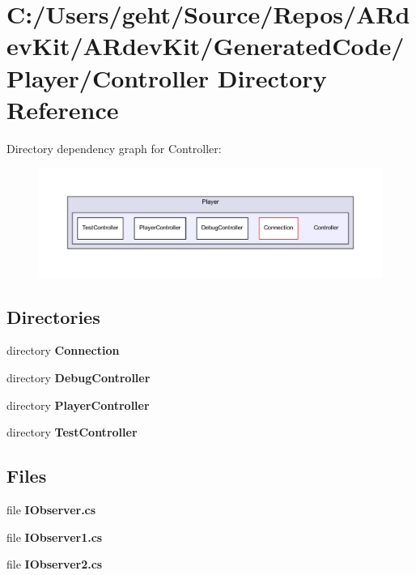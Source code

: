 \section{C\-:/\-Users/geht/\-Source/\-Repos/\-A\-Rdev\-Kit/\-A\-Rdev\-Kit/\-Generated\-Code/\-Player/\-Controller Directory Reference}
\label{dir_fa5375c86574866ac7e5551105b9b406}
Directory dependency graph for Controller\-:
\nopagebreak
\begin{figure}[H]
\begin{center}
\leavevmode
\includegraphics[width=350pt]{dir_fa5375c86574866ac7e5551105b9b406_dep}
\end{center}
\end{figure}
\subsection*{Directories}
\begin{DoxyCompactItemize}
\item 
directory {\bf Connection}
\item 
directory {\bf Debug\-Controller}
\item 
directory {\bf Player\-Controller}
\item 
directory {\bf Test\-Controller}
\end{DoxyCompactItemize}
\subsection*{Files}
\begin{DoxyCompactItemize}
\item 
file {\bfseries I\-Observer.\-cs}
\item 
file {\bfseries I\-Observer1.\-cs}
\item 
file {\bfseries I\-Observer2.\-cs}
\end{DoxyCompactItemize}
